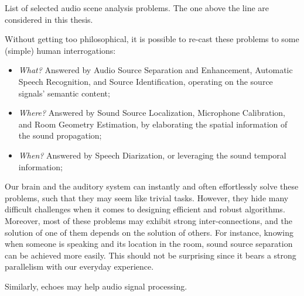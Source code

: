 \begin{table}[!h]

    \begin{fullwidth}
    \centering
    \small

    
    \caption{List of selected audio scene analysis problems. The one above the line are considered in this thesis.}
    \label{tab:processing:problems}

    \end{fullwidth}

\end{table}

\mynewline
Without getting too philosophical, it is possible to re-cast these problems to some (simple) human interrogations:
\begin{itemize}
    \item  \textit{What?} Answered by Audio Source Separation and Enhancement, Automatic Speech Recognition, and Source Identification, operating on the source signals' semantic content;
    \item  \textit{Where?} Answered by Sound Source Localization, Microphone Calibration, and Room Geometry Estimation, by elaborating the spatial information of the sound propagation;
    \item  \textit{When?} Answered by Speech Diarization, or leveraging the sound temporal information;
\end{itemize}

\noindent Our
brain and the auditory system can instantly and often effortlessly solve these problems, such that they may seem like trivial tasks.
However, they hide many difficult challenges when it comes to designing efficient and robust algorithms.
Moreover, most of these problems may exhibit strong inter-connections, and the solution of one of them depends on the solution of others.
For instance, knowing when someone is speaking and its location in the room, sound source separation can be achieved more easily.
This should not be surprising since it bears a strong parallelism with our everyday experience.

\mynewline
Similarly, echoes may help audio signal processing.

